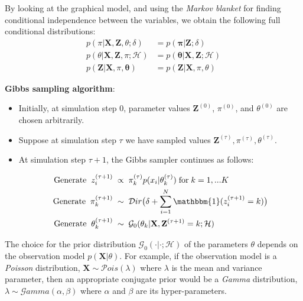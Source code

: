 By looking at the graphical model, and using the \emph{Markov blanket} for finding conditional independence between the variables, we obtain the following full conditional distributions:
\begin{equation}%
  \begin{aligned}
	p(\pi|\mathbf{X},\mathbf{Z},\theta;\delta) & = p(\mathbf{\pi} | \mathbf{Z};\delta) \\ 
	p(\theta|\mathbf{X},\mathbf{Z},\pi;\mathcal{H}) & = p(\mathbf{\theta}|\mathbf{X},\mathbf{Z};\mathcal{H})  \\
	p(\mathbf{Z}|\mathbf{X},\pi, \mathbf{\theta}) & = p(\mathbf{Z}|\mathbf{X},\pi, \theta)
  \end{aligned}
\end{equation}

\noindent\textbf{Gibbs sampling algorithm}: 
\begin{itemize}
\item {Initially, at simulation step 0, parameter values $\mathbf{Z}^{(0)}$, $\pi^{(0)}$, and $\theta^{(0)}$ are chosen arbitrarily.}
\item {Suppose at simulation step $\tau$ we have sampled values $\mathbf{Z}^{(\tau)}, \pi^{(\tau)}, \theta^{(\tau)}$.}
\item { At simulation step $\tau + 1$, the Gibbs sampler continues as follows:

\begin{equation*}%
  \begin{aligned}
    \text{Generate} \; \; z_{i}^{(\tau+1)} \; & \propto \; \pi_{k}^{(\tau)}p(x_{i}|\theta_{k}^{(\tau)}) \; \text{for} \; k=1,...K \\
    \text{Generate} \; \; \pi_{k}^{(\tau+1)} \; & \sim \; \mathcal{D}ir\big(\delta + \sum_{i=1}^{N}\mathbbm{1}(z_{i}^{(\tau+1)}=k)\big) \\
    \text{Generate} \; \; \theta_{k}^{(\tau+1)} \; & \sim \; \mathcal{G}_{0}(\theta_{k}| \mathbf{X}, \mathbf{Z}^{(\tau+1)}=k; \mathcal{H})
  \end{aligned}
\end{equation*}
}
\end{itemize}

The choice for the prior distribution $\mathcal{G}_{0}(\cdot| \cdot; \mathcal{H})$ of the parameters $\theta$ depends on the observation model $p(\mathbf{X}|\theta)$. For example, if the observation model is a \emph{Poisson} distribution, \ie $\mathbf{X} \sim \mathcal{P}ois(\lambda)$ where $\lambda$ is the mean and variance parameter, then an appropriate conjugate prior would be a \emph{Gamma} distribution, \ie $\lambda \sim \mathcal{G}amma(\alpha, \beta)$ where $\alpha$ and $\beta$ are its hyper-parameters.